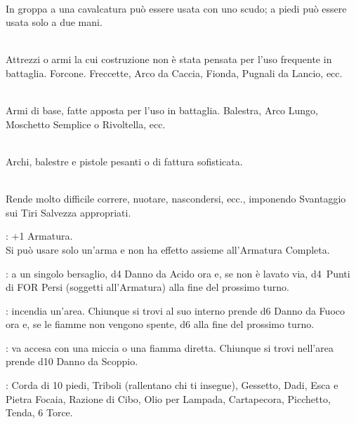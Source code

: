 \documentclass[itdr]{subfiles}
\begin{document}
\\In groppa a una cavalcatura può essere usata con uno scudo; a piedi può essere usata solo a due mani.
\vfill


\\Attrezzi o armi la cui costruzione non è stata pensata per l’uso frequente in battaglia. Forcone. Freccette, Arco da Caccia, Fionda, Pugnali da Lancio, ecc.

\\Armi di base, fatte apposta per l’uso in battaglia. Balestra, Arco Lungo, Moschetto Semplice o Rivoltella, ecc.

\\Archi, balestre e pistole pesanti o di fattura sofisticata. 

\vfill



\\Rende molto difficile correre, nuotare, nascondersi, ecc., imponendo Svantaggio sui Tiri Salvezza appropriati.

: +1 Armatura.\\Si può usare solo un'arma e non ha effetto assieme all’Armatura Completa.

\break


: a un singolo bersaglio, d4 Danno da Acido ora e, se non è lavato via, d4~Punti di FOR Persi (soggetti all'Armatura) alla fine del prossimo turno.

: incendia un'area. Chiunque si trovi al suo interno prende d6 Danno da Fuoco ora e, se le fiamme non vengono spente, d6 alla fine del prossimo turno.

: va accesa con una miccia o una fiamma diretta. Chiunque si trovi nell'area prende d10 Danno da Scoppio.

: Corda di 10 piedi, Triboli (rallentano chi ti insegue), Gessetto, Dadi, Esca e Pietra Focaia, Razione di Cibo, Olio per Lampada, Cartapecora, Picchetto, Tenda, 6 Torce.
\end{document}
